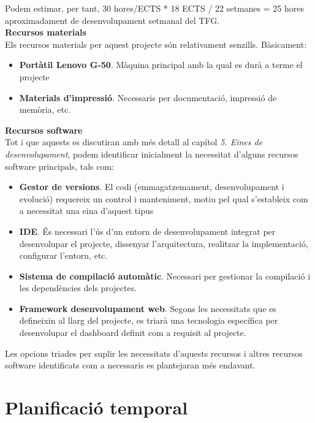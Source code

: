 Podem estimar, per tant, 30 hores/ECTS * 18 ECTS / 22 setmanes = 25 hores aproximadament de desenvolupament setmanal del TFG.\\

\noindent \textbf{\large Recursos materials}\\

\noindent Els recursos materials per aquest projecte són relativament senzills. Bàsicament:

\begin{itemize}
\item \textbf{Portàtil Lenovo G-50}. Màquina principal amb la qual es durà a terme el projecte
\item \textbf{Materials d'impressió}. Necessaris per documentació, impressió de memòria, etc.
\end{itemize}

\noindent \textbf{\large Recursos software}\\

\noindent Tot i que aquests es discutiran amb més detall al capítol \textit{5. Eines de desenvolupament}, podem identificar inicialment la necessitat d'alguns recursos software principals, tals com:

\begin{itemize}
\item \textbf{Gestor de versions}. El codi (emmagatzemament, desenvolupament i evolució) requereix un control i manteniment, motiu pel qual s'estableix com a necessitat una eina d'aquest tipus
\item \textbf{IDE}. És necessari l'ús d'un entorn de desenvolupament integrat per desenvolupar el projecte, dissenyar l'arquitectura, realitzar la implementació, configurar l'entorn, etc.
\item \textbf{Sistema de compilació automàtic}. Necessari per gestionar la compilació i les dependències dels projectes.
\item \textbf{Framework desenvolupament web}. Segons les necessitats que es defineixin al llarg del projecte, es triarà una tecnologia específica per desenvolupar el dashboard definit com a requisit al projecte.
\end{itemize}

Les opcions triades per suplir les necessitats d'aquests recursos i altres recursos software identificats com a necessaris es plantejaran més endavant.

\section{Planificació temporal}

